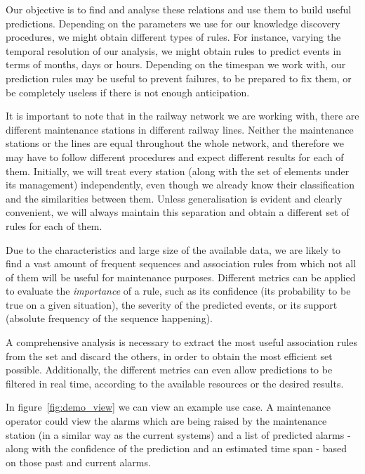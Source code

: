 Our objective is to find and analyse these relations and use them to build useful predictions. Depending on the parameters we use for our knowledge discovery procedures, we might obtain different types of rules. For instance, varying the temporal resolution of our analysis, we might obtain rules to predict events in terms of months, days or hours. Depending on the timespan we work with, our prediction rules may be useful to prevent failures, to be prepared to fix them, or be completely useless if there is not enough anticipation.

It is important to note that in the railway network we are working with, there are different maintenance stations in different railway lines. Neither the maintenance stations or the lines are equal throughout the whole network, and therefore we may have to follow different procedures and expect different results for each of them. Initially, we will treat every station (along with the set of elements under its management) independently, even though we already know their classification and the similarities between them. Unless generalisation is evident and clearly convenient, we will always maintain this separation and obtain a different set of rules for each of them.

Due to the characteristics and large size of the available data, we are likely to find a vast amount of frequent sequences and association rules from which not all of them will be useful for maintenance purposes. Different metrics can be applied to evaluate the \emph{importance} of a rule, such as its confidence (its probability to be true on a given situation), the severity of the predicted events, or its support (absolute frequency of the sequence happening).

A comprehensive analysis is necessary to extract the most useful association rules from the set and discard the others, in order to obtain the most efficient set possible. Additionally, the different metrics can even allow predictions to be filtered in real time, according to the available resources or the desired results.

In figure~\ref{fig:demo_view} we can view an example use case. A maintenance operator could view the alarms which are being raised by the maintenance station (in a similar way as the current systems) and a list of predicted alarms - along with the confidence of the prediction and an estimated time span - based on those past and current alarms.

